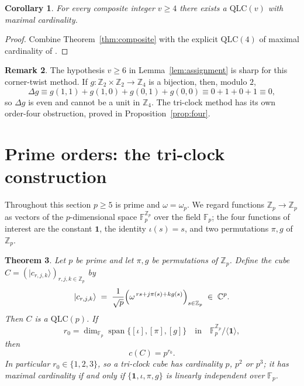\documentclass[11pt]{amsart}
\newtheorem{theorem}{Theorem}[section]
\newtheorem{corollary}[theorem]{Corollary}
\theoremstyle{definition}
\newtheorem{remark}[theorem]{Remark}
\newcommand{\C}{\mathbb{C}}
\newcommand{\Z}{\mathbb{Z}}
\newcommand{\F}{\mathbb{F}}
\newcommand{\ket}[1]{|#1\rangle}
\newcommand{\QLC}{\mathrm{QLC}}
\begin{document}
\begin{corollary}\label{cor:composite}
For every composite integer $v\ge4$ there exists a $\QLC(v)$ with maximal
cardinality.
\end{corollary}

\begin{proof}
Combine Theorem~\ref{thm:composite} with the explicit $\QLC(4)$ of maximal
cardinality of \cite[Ex.~4.1]{ZZLC2026}.
\end{proof}

\begin{remark}
The hypothesis $v\ge6$ in Lemma~\ref{lem:assignment} is sharp for this
corner-twist method.  If $g:\Z_2\times\Z_2\to\Z_4$ is a bijection, then,
modulo $2$,
\[
\Delta g\equiv g(1,1)+g(1,0)+g(0,1)+g(0,0)
\equiv0+1+0+1\equiv0,
\]
so $\Delta g$ is even and cannot be a unit in $\Z_4$.  The tri-clock method
has its own order-four obstruction, proved in Proposition~\ref{prop:four}.
\end{remark}

\section{Prime orders: the tri-clock construction}\label{sec:prime}

Throughout this section $p\ge5$ is prime and $\omega=\omega_p$.  We regard
functions $\Z_p\to\Z_p$ as vectors of the $p$-dimensional space
$\F_p^{\Z_p}$ over the field $\F_p$; the four functions of interest are the
constant $\mathbf1$, the identity $\iota(s)=s$, and two permutations
$\pi,g$ of $\Z_p$.

\begin{theorem}\label{thm:triclock}
Let $p$ be prime and let $\pi,g$ be permutations of $\Z_p$.  Define the
cube $C=(\ket{c_{r,j,k}})_{r,j,k\in\Z_p}$ by
\[
\ket{c_{r,j,k}}\;=\;\frac1{\sqrt p}
\Bigl(\omega^{\,rs+j\pi(s)+kg(s)}\Bigr)_{s\in\Z_p}\;\in\;\C^p .
\]
Then $C$ is a $\QLC(p)$.  If
\[
r_0=\dim_{\F_p}\operatorname{span}
\bigl\{[\iota],[\pi],[g]\bigr\}
\quad\text{in}\quad
\F_p^{\Z_p}/\langle\mathbf1\rangle ,
\]
then
\[
c(C)=p^{r_0}.
\]
In particular $r_0\in\{1,2,3\}$, so a tri-clock cube has cardinality
$p$, $p^2$ or $p^3$; it has maximal cardinality if and only if
$\{\mathbf1,\iota,\pi,g\}$ is linearly independent over $\F_p$.
\end{theorem}
\end{document}
